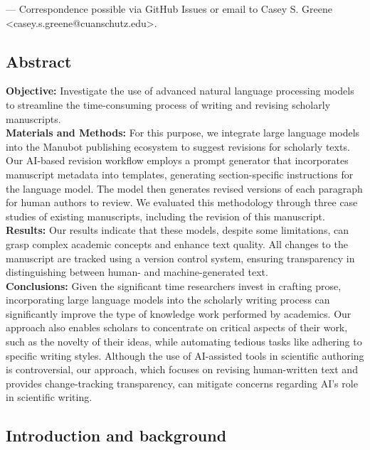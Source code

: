 \documentclass[
]{article}
\begin{document}
\leavevmode{}%
\Letter --- Correspondence possible via GitHub Issues
or email to
Casey S. Greene \textless casey.s.greene@cuanschutz.edu\textgreater.

\hypertarget{abstract}{%
\subsection{Abstract}\label{abstract}}

\textbf{Objective:} Investigate the use of advanced natural language processing models to streamline the time-consuming process of writing and revising scholarly manuscripts.\\
\textbf{Materials and Methods:} For this purpose, we integrate large language models into the Manubot publishing ecosystem to suggest revisions for scholarly texts.
Our AI-based revision workflow employs a prompt generator that incorporates manuscript metadata into templates, generating section-specific instructions for the language model.
The model then generates revised versions of each paragraph for human authors to review.
We evaluated this methodology through three case studies of existing manuscripts, including the revision of this manuscript.\\
\textbf{Results:} Our results indicate that these models, despite some limitations, can grasp complex academic concepts and enhance text quality.
All changes to the manuscript are tracked using a version control system, ensuring transparency in distinguishing between human- and machine-generated text.\\
\textbf{Conclusions:} Given the significant time researchers invest in crafting prose, incorporating large language models into the scholarly writing process can significantly improve the type of knowledge work performed by academics.
Our approach also enables scholars to concentrate on critical aspects of their work, such as the novelty of their ideas, while automating tedious tasks like adhering to specific writing styles.
Although the use of AI-assisted tools in scientific authoring is controversial, our approach, which focuses on revising human-written text and provides change-tracking transparency, can mitigate concerns regarding AI's role in scientific writing.

\hypertarget{introduction}{%
\subsection{Introduction and background}\label{introduction}}
\end{document}
